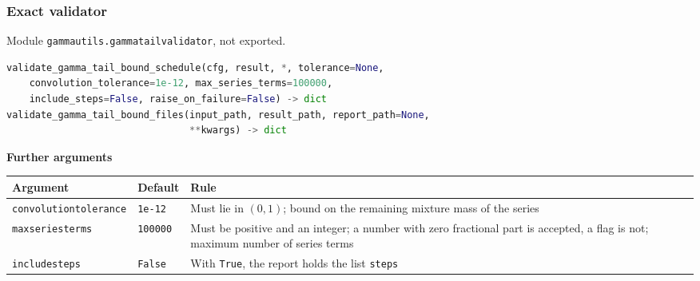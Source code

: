 \documentclass[11pt,a4paper]{article}
\makeatletter
\theoremstyle{plain}
\theoremstyle{definition}
\newcommand{\blockhead}[1]{\par\noindent\textbf{#1}\par\nobreak}
\renewcommand{\_}{\textunderscore\allowbreak{}}
\providecommand{\typerow}[3]{{\raggedright #1\par} & {\raggedright #2\par} & {\raggedright #3\par} \\}
\providecommand{\tabstart}[2]{\begingroup\small\begin{longtable}{@{}#1@{}}\toprule #2 \\ \midrule \endhead}
\providecommand{\tabend}{\bottomrule\end{longtable}\endgroup}
\makeatother
\begin{document}
\subsubsection{Exact validator}

Module \texttt{gamma\_utils.gamma\_tail\_validator}, not exported.

\begin{lstlisting}[language=Python]
validate_gamma_tail_bound_schedule(cfg, result, *, tolerance=None,
    convolution_tolerance=1e-12, max_series_terms=100000,
    include_steps=False, raise_on_failure=False) -> dict
validate_gamma_tail_bound_files(input_path, result_path, report_path=None,
                                **kwargs) -> dict
\end{lstlisting}

\blockhead{Further arguments}
\tabstart{p{4.3cm}p{2.3cm}p{8.2cm}}{Argument & Default & Rule}
\typerow{\texttt{convolution\_tolerance}}{\texttt{1e-12}}{Must lie in $(0,1)$; bound on the remaining mixture mass of the series}
\typerow{\texttt{max\_series\_terms}}{\texttt{100000}}{Must be positive and an integer; a number with zero fractional part is accepted, a flag is not; maximum number of series terms}
\typerow{\texttt{include\_steps}}{\texttt{False}}{With \texttt{True}, the report holds the list \texttt{steps}}
\tabend
\end{document}
